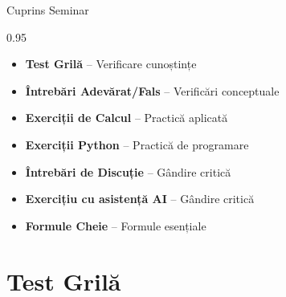 \documentclass[9pt, aspectratio=169, t]{beamer}
\subtitle{Seminar 2: Modele ARMA}
\begin{document}
{
\begin{frame}
    \titlepage
\end{frame}
}

\begin{frame}{Cuprins Seminar}
    \begin{cminipage}{0.95\textwidth}
    \begin{itemize}\setlength{\itemsep}{0pt}
        \item \textbf{Test Grilă} -- Verificare cunoștințe
        \vspace{0.15cm}
        \item \textbf{Întrebări Adevărat/Fals} -- Verificări conceptuale
        \vspace{0.15cm}
        \item \textbf{Exerciții de Calcul} -- Practică aplicată
        \vspace{0.15cm}
        \item \textbf{Exerciții Python} -- Practică de programare
        \vspace{0.15cm}
        \item \textbf{Întrebări de Discuție} -- Gândire critică
        \vspace{0.15cm}
        \item \textbf{Exercițiu cu asistență AI} -- Gândire critică
        \vspace{0.15cm}
        \item \textbf{Formule Cheie} -- Formule esențiale
    \end{itemize}
    \end{cminipage}
\end{frame}


\section{Test Grilă}
\end{document}
